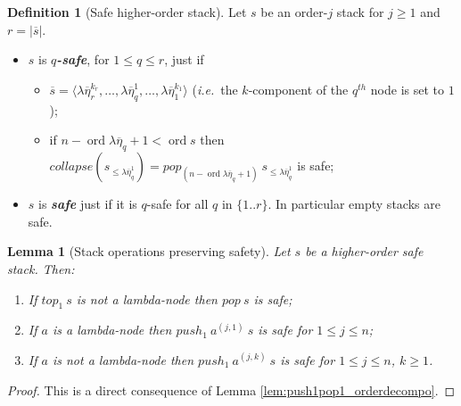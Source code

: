 \documentclass{article}
\newcommand{\ord}{\mathop{\mathrm{ord}}}
\newcommand{\prefixof}{\leqslant}
\newcommand\defname[1]{{\bf\em #1}\index{#1}}
\newtheorem{lemma}{Lemma}[section]
\theoremstyle{remark}
\theoremstyle{definition}
\newtheorem{definition}{Definition}[section]
\newcommand\orddec\overline
\begin{document}
\begin{definition}[Safe higher-order stack]
\label{dfn:safestack} Let $s$ be an order-$j$ stack for $j\geq1$ and $r
= |\orddec{s}|$.
\begin{itemize}[-]
\item $s$ is \defname{$q$-safe}, for $1 \leq q \leq r$, just if
\begin{itemize}
\item $\orddec{s} = \langle \lambda \overline{\eta}_r^{k_r}, \ldots ,
\lambda \overline{\eta}_q^1, \ldots , \lambda
\overline{\eta}_1^{k_1} \rangle$ ({\it i.e.}~the
$k$-component of the $q^{th}$ node is set to $1$);

\item if $n-\ord{\lambda \overline{\eta}_q}+1 < \ord{s}$ then  $collapse (s_{\prefixof \lambda \overline{\eta}_q^1}) = pop_{(n-\ord{\lambda \overline{\eta}_q}+1)}\  s_{\prefixof \lambda \overline{\eta}_q^1}$ is safe;
\end{itemize}
\item $s$ is \defname{safe} just if it is $q$-safe for all $q$ in $\{1..r\}$. In particular empty stacks are safe.
\end{itemize}
\end{definition}


\begin{lemma}[Stack operations preserving safety]
\label{lem:push1pop1_preserves_safety} Let $s$ be a higher-order
safe stack. Then:
\begin{enumerate}
  \item If $top_1\ s$ is not a lambda-node then $pop\ s$ is safe;
  \item If $a$ is a lambda-node then $push_1\ a^{(j,1)}\ s$ is safe for $1 \leq j \leq n$;
  \item If $a$ is not a lambda-node then $push_1\ a^{(j,k)}\ s$
is safe for $1 \leq j \leq n$, $k \geq 1$.
\end{enumerate}
\end{lemma}
\begin{proof}
This is a direct consequence of Lemma
\ref{lem:push1pop1_orderdecompo}.
\end{proof}
\end{document}
